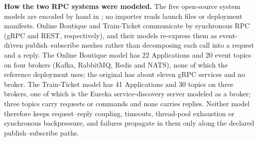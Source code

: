 \documentclass[preprint,3p]{elsarticle}
\begin{document}
\noindent\textbf{How the two RPC systems were modeled.} The five open-source system models are encoded by hand in ; no importer reads launch files or deployment manifests. Online Boutique and Train-Ticket communicate by synchronous RPC (gRPC and REST, respectively), and their models re-express them as event-driven publish--subscribe meshes rather than decomposing each call into a request and a reply. The Online Boutique model has 22 Applications and 20 event topics on four brokers (Kafka, RabbitMQ, Redis and NATS), none of which the reference deployment uses; the original has about eleven gRPC services and no broker. The Train-Ticket model has 41 Applications and 30 topics on three brokers, one of which is the Eureka service-discovery server modeled as a broker; three topics carry requests or commands and none carries replies. Neither model therefore keeps request--reply coupling, timeouts, thread-pool exhaustion or synchronous backpressure, and failures propagate in them only along the declared publish--subscribe paths.
\end{document}
